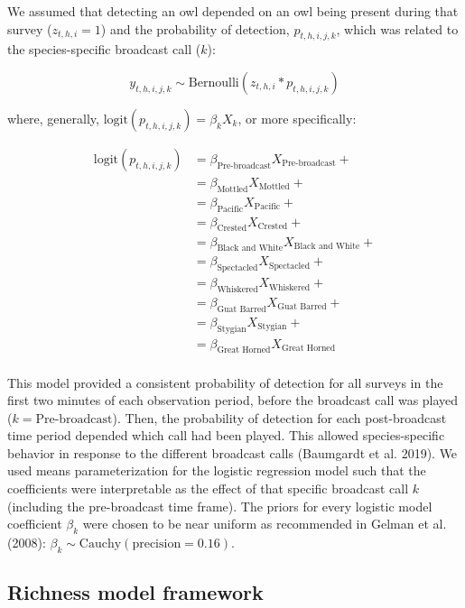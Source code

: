 \documentclass[
]{article}
\begin{document}
We assumed that detecting an owl depended on an owl being present during
that survey (\(z_{t,h,i} = 1\)) and the probability of detection,
\(p_{t,h,i,j,k}\), which was related to the species-specific broadcast
call (\(k\)):

\[
y_{t,h,i,j,k} \sim \text{Bernoulli}(z_{t,h,i}*p_{t,h,i,j,k})
\]

where, generally, \(\text{logit}(p_{t,h,i,j,k}) = \beta_kX_k\), or more
specifically:

\[
\begin{aligned}
\text{logit}(p_{t,h,i,j,k}) &= \beta_\text{Pre-broadcast}X_\text{Pre-broadcast} + \\
&= \beta_\text{Mottled}X_\text{Mottled}+\\
&= \beta_\text{Pacific}X_\text{Pacific}+\\
&= \beta_\text{Crested}X_\text{Crested}+\\
&= \beta_\text{Black and White}X_\text{Black and White}+\\
&= \beta_\text{Spectacled}X_\text{Spectacled}+\\
&= \beta_\text{Whiskered}X_\text{Whiskered}+\\
&= \beta_\text{Guat Barred}X_\text{Guat Barred}+\\
&= \beta_\text{Stygian}X_\text{Stygian}+\\
&= \beta_\text{Great Horned}X_\text{Great Horned}\\
\end{aligned}
\]

This model provided a consistent probability of detection for all
surveys in the first two minutes of each observation period, before the
broadcast call was played (\(k = \text{Pre-broadcast}\)). Then, the
probability of detection for each post-broadcast time period depended
which call had been played. This allowed species-specific behavior in
response to the different broadcast calls (Baumgardt et al. 2019). We
used means parameterization for the logistic regression model such that
the coefficients were interpretable as the effect of that specific
broadcast call \(k\) (including the pre-broadcast time frame). The
priors for every logistic model coefficient \(\beta_k\) were chosen to
be near uniform as recommended in Gelman et al. (2008):
\(\beta_k \sim \text{Cauchy}(\text{precision} = 0.16)\).

\hypertarget{richness-model-framework}{%
\subsection{Richness model framework}\label{richness-model-framework}}
\end{document}
